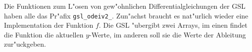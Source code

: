 Die Funktionen zum L"osen von gew"ohnlichen Differentialgleichungen
der GSL haben alle das Pr"afix \texttt{gsl\_odeiv2\_}. 
Zun"achst braucht es nat"urlich wieder eine Implementation der
Funktion $f$. 
Die GSL "ubergibt zwei Arrays, im einen findet die Funktion die aktuellen
$y$-Werte, im anderen soll sie die Werte der Ableitung zur"uckgeben.




